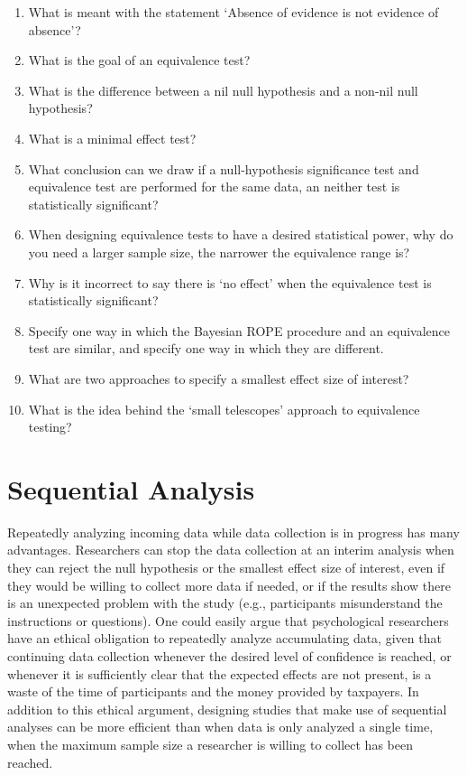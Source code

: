 \documentclass[
  oneside]{krantz}
\begin{document}
\begin{enumerate}
\def\labelenumi{\arabic{enumi}.}
\item
  What is meant with the statement `Absence of evidence is not evidence of absence'?
\item
  What is the goal of an equivalence test?
\item
  What is the difference between a nil null hypothesis and a non-nil null hypothesis?
\item
  What is a minimal effect test?
\item
  What conclusion can we draw if a null-hypothesis significance test and equivalence test
  are performed for the same data, an neither test is statistically significant?
\item
  When designing equivalence tests to have a desired statistical power, why do you need a
  larger sample size, the narrower the equivalence range is?
\item
  Why is it incorrect to say there is `no effect' when the equivalence test is statistically significant?
\item
  Specify one way in which the Bayesian ROPE procedure and an equivalence test are similar, and specify one way in which they are different.
\item
  What are two approaches to specify a smallest effect size of interest?
\item
  What is the idea behind the `small telescopes' approach to equivalence testing?
\end{enumerate}

\hypertarget{sequential}{%
\chapter{Sequential Analysis}\label{sequential}}

Repeatedly analyzing incoming data while data collection is in progress has many advantages. Researchers can stop the data collection at an interim analysis when they can reject the null hypothesis or the smallest effect size of interest, even if they would be willing to collect more data if needed, or if the results show there is an unexpected problem with the study (e.g., participants misunderstand the instructions or questions). One could easily argue that psychological researchers have an ethical obligation to repeatedly analyze accumulating data, given that continuing data collection whenever the desired level of confidence is reached, or whenever it is sufficiently clear that the expected effects are not present, is a waste of the time of participants and the money provided by taxpayers. In addition to this ethical argument, designing studies that make use of sequential analyses can be more efficient than when data is only analyzed a single time, when the maximum sample size a researcher is willing to collect has been reached.
\end{document}
